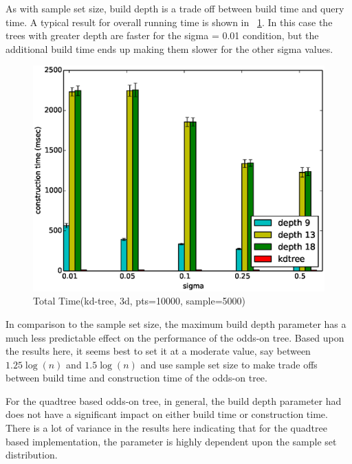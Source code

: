 \documentclass[mcs]{scsthesis}
\begin{document}
As with sample set size, build depth is a trade off between build time and query
time. A typical result for overall running time is shown in
~\ref{fig:max_build_depth_total}. In this case the trees with greater depth are
faster for the sigma = 0.01 condition, but the additional build time ends up
making them slower for the other sigma values.

\begin{figure}
\begin{center}
\includegraphics[scale=0.5]{diagrams/kt_3d_pts10000_sample5000_ctime.eps}
\caption{Total Time(kd-tree, 3d, pts=10000, sample=5000)}
\label{fig:max_build_depth_total}
\end{center}
\end{figure}

In comparison to the sample set size, the maximum build depth parameter has
a much less predictable effect on the performance of the odds-on tree. Based
upon the results here, it seems best to set it at a moderate value, say between
$1.25\log(n)$ and $1.5\log(n)$ and use sample set size to make trade offs
between build time and construction time of the odds-on tree.

For the quadtree based odds-on tree, in general, the build depth parameter had
does not have a significant impact on either build time or construction time.
There is a lot of variance in the results here indicating that for the quadtree
based implementation, the parameter is highly dependent upon the sample set
distribution.
\end{document}
